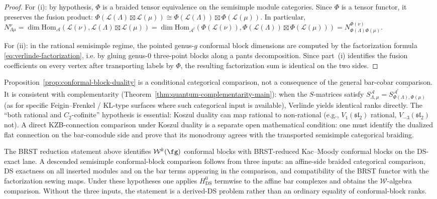 \begin{proof}
For (i): by hypothesis, $\Phi$ is a braided tensor equivalence on the
semisimple module categories. Since $\Phi$ is a tensor functor, it
preserves the fusion product:
$\Phi(\mathcal{L}(\Lambda) \boxtimes \mathcal{L}(\mu))
\cong \Phi(\mathcal{L}(\Lambda)) \boxtimes
\Phi(\mathcal{L}(\mu))$. In particular,
$N_{\Lambda\mu}^{\nu}
= \dim \mathrm{Hom}_{\mathcal{A}}(\mathcal{L}(\nu),
\mathcal{L}(\Lambda) \boxtimes \mathcal{L}(\mu))
= \dim \mathrm{Hom}_{\mathcal{A}^!}(\Phi(\mathcal{L}(\nu)),
\Phi(\mathcal{L}(\Lambda)) \boxtimes \Phi(\mathcal{L}(\mu)))
= N_{\Phi(\Lambda)\Phi(\mu)}^{\Phi(\nu)}$.

For (ii): in the rational semisimple regime, the pointed genus-$g$
conformal block dimensions are computed by the factorization formula
\eqref{eq:verlinde-factorization}, i.e. by gluing genus-$0$ three-point
blocks along a pants decomposition. Since part~(i) identifies the
fusion coefficients on every vertex after transporting labels by
$\Phi$, the resulting factorization sum is identical on the two sides.
\end{proof}

\begin{remark}
\label{rem:conformal-block-complementarity}
Proposition~\ref{prop:conformal-block-duality} is a conditional
categorical comparison, not a consequence of the general
bar-cobar comparison. It is consistent with complementarity
\textup{(}Theorem~\ref{thm:quantum-complementarity-main}\textup{)}:
when the $S$-matrices satisfy
$S^{\mathcal{A}}_{\Lambda,\mu}
= \overline{S^{\mathcal{A}^!}_{\Phi(\Lambda),\Phi(\mu)}}$
\textup{(}as for specific Feigin--Frenkel / KL-type surfaces where such
categorical input is available\textup{)}, Verlinde yields identical
ranks directly. The ``both rational and $C_2$-cofinite'' hypothesis is
essential: Koszul duality can map rational to non-rational
\textup{(}e.g., $V_1(\mathfrak{sl}_2)$ rational,
$V_{-3}(\mathfrak{sl}_2)$ not\textup{)}. A direct KZB-connection
comparison under Koszul duality is a separate open mathematical condition: one
must identify the dualized flat connection on the bar-comodule side
and prove that its monodromy agrees with the transported
semisimple categorical braiding.
\end{remark}

\begin{remark}
\label{rem:ds-conformal-block-comparison-scope}
The BRST reduction statement above identifies
$\mathcal{W}^k(\fg)$ conformal blocks with BRST-reduced
Kac--Moody conformal blocks on the DS-exact lane. A descended
semisimple conformal-block comparison follows from three inputs:
an affine-side braided categorical comparison, DS exactness on all
inserted modules and on the bar terms appearing in the comparison, and
compatibility of the BRST functor with the factorization sewing maps.
Under these hypotheses one applies $H^0_{\mathrm{DS}}$ termwise to the
affine bar complexes and obtains the $\mathcal W$-algebra comparison.
Without the three inputs, the statement is a derived-DS problem rather
than an ordinary equality of conformal-block ranks.
\end{remark}

